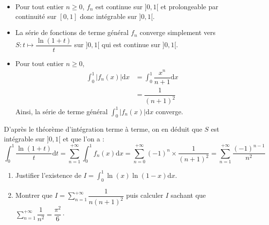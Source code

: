 \documentclass[a4paper,twoside,french,11pt]{VcCours}
\newcommand{\dx}{\text{d}x}
\newcommand{\dt}{\text{d}t}
\begin{document}
\begin{itemize}
\item Pour tout entier $n \geq 0$, $f_n$ est continue sur $]0,1[$ et prolongeable par continuité sur $[0,1]$ donc intégrable sur $]0,1[$.
\item La série de fonctions de terme général $f_n$ converge simplement vers $S: t \mapsto \dfrac{\ln(1+t)}{t}$ sur $]0,1[$ qui est continue sur $]0,1[$.
\item Pour tout entier $n \geq 0$,
\begin{align*}
\int_0^1 \vert f_n(x) \vert\dx & = \int_0^1 \dfrac{x^n}{n+1} \dx \\
& = \dfrac{1}{(n+1)^2}
\end{align*}
Ainsi, la série de terme général $\int_0^1 \vert f_n(x) \vert\dx$ converge.
\end{itemize}
D'après le théorème d'intégration terme à terme, on en déduit que $S$ est intégrable sur $]0,1[$ et que l'on a :
$$ \int_0^1 \dfrac{\ln(1+t)}{t} \dt = \sum_{n=1}^{+ \infty} \int_0^1 f_n(x) \dx = \sum_{n=0}^{+ \infty} (-1)^{n} \times \dfrac{1}{(n+1)^2} = \sum_{n=1}^{+ \infty} \dfrac{(-1)^{n-1}}{n^2}$$

\begin{Exercice}{}
\begin{enumerate}
\item Justifier l'existence de $I= \int_{0}^1 \ln(x) \ln(1-x) \dx$.
\item Montrer que $I =\sum_{n=1}^{+ \infty} \dfrac{1}{n(n+1)^2}$ puis calculer $I$ sachant que $\sum_{n=1}^{+ \infty} \dfrac{1}{n^2} = \dfrac{\pi^2}{6}\cdot$
\end{enumerate}
\end{Exercice}
\end{document}

